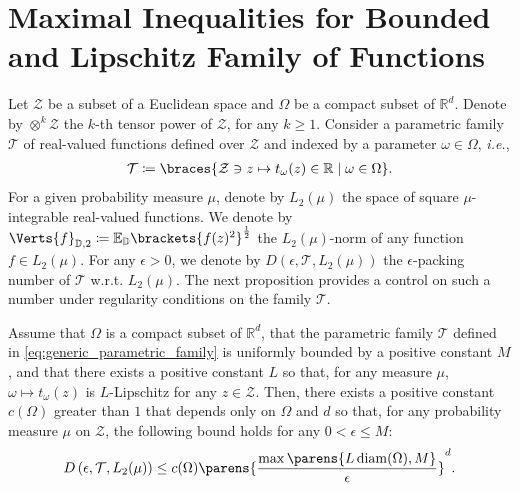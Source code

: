 \section{Maximal Inequalities for Bounded and Lipschitz Family of Functions}\label{sec_app:max_in_bound_lip}
Let  $\mathcal{Z}$ be a subset of a Euclidean space and $\Omega$ be a compact subset of $\mathbb{R}^d$. Denote by $\otimes^{k} \mathcal{Z}$ the $k$-th tensor power of $\mathcal{Z}$, for any $k\geq 1$. Consider a parametric family $\mathcal{T}$ of real-valued functions defined over $\mathcal{Z}$ and indexed by a parameter $\omega\in \Omega$, \textit{i.e.}, 
\begin{align}\label{eq:generic_parametric_family}
	\mathcal{T}\coloneqq \braces{\mathcal{Z}\ni z\mapsto t_{\omega}(z)\in \mathbb{R}\mid\omega \in \Omega}.
\end{align}
For a given probability measure $\mu$, denote by $L_2(\mu)$ the space of square $\mu$-integrable real-valued functions. We denote by $\Verts{f}_{\PP,2}\coloneqq  \mathbb{E}_{\PP}\brackets{f(z)^2}^{\frac{1}{2}}$ the $L_2(\mu)$-norm of any function $f\in L_2(\mu)$.  For any $\epsilon>0$, we denote by  $D\left(\epsilon,\mathcal{T},L_2(\mu)\right)$ the $\epsilon$-packing number of $\mathcal{T}$ w.r.t. $L_2(\mu)$. The next proposition provides a control on such a number under regularity conditions on the family $\mathcal{T}$. 
\begin{proposition}\label{prop:estimate_covering_numbers}
	Assume that $\Omega$ is a compact subset of $\mathbb{R}^d$, that the parametric family $\mathcal{T}$ defined in \cref{eq:generic_parametric_family} is uniformly bounded by a positive constant $M$, and that there exists a positive constant $L$ so that, for any measure $\mu$,	$\omega \mapsto t_{\omega}(z)$ is $L$-Lipschitz for any $z\in \mathcal{Z}$. Then, there exists a positive constant $c(\Omega)$ greater than $1$ that depends only on $\Omega$ and $d$ so that, for any probability measure $\mu$ on $\mathcal{Z}$, the following bound holds for any $0<\epsilon\leq M$:
\begin{align*}  
 D\left(\epsilon,\mathcal{T},L_2(\mu)\right)\leq c(\Omega)\parens{\frac{\max\parens{L\diam(\Omega),M}}{\epsilon}}^d.
\end{align*}
\end{proposition}
